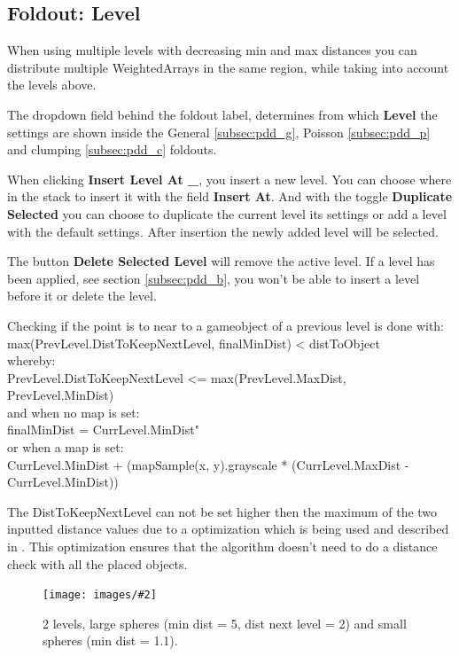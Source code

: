 \documentclass{paper}
\newlength{\imgwidth} %
\newcommand\scalegraphics[3][]
{
	\begin{figure}[H]
	\centering
	\settowidth{\imgwidth}{\texttt{[image: images/\#2]}} %
	\setlength{\imgwidth}{\minof{#1\imgwidth}{\textwidth}} %
	\texttt{[image: images/\#2]} %
	\caption{#3}
	\end{figure}
}
\newcommand*\bracket[1]{\lbrack#1\rbrack} %
\begin{document}
\subsection{Foldout: Level}
When using multiple levels with decreasing min and max distances you can distribute multiple WeightedArrays in the same region, while taking into account the levels above.
\par
The dropdown field behind the foldout label, determines from which \textbf{Level} the settings are shown inside the General \bracket{\ref{subsec:pdd_g}}, Poisson \bracket{\ref{subsec:pdd_p}} and clumping \bracket{\ref{subsec:pdd_c}} foldouts. 
\par
When clicking \textbf{\bracket{Insert Level At \_}}, you insert a new level. You can choose where in the stack to insert it with the field \textbf{Insert At}. And with the toggle \textbf{Duplicate Selected} you can choose to duplicate the current level its settings or add a level with the default settings. After insertion the newly added level will be selected.
\par
The button \textbf{\bracket{Delete Selected Level}} will remove the active level. If a level has been applied, see section \bracket{\ref{subsec:pdd_b}}, you won't be able to insert a level before it or delete the level.
\par
Checking if the point is to near to a gameobject of a previous level is done with:\\
\qquad max(PrevLevel.DistToKeepNextLevel, finalMinDist) < distToObject\\
whereby:\\
\qquad PrevLevel.DistToKeepNextLevel <= max(PrevLevel.MaxDist, PrevLevel.MinDist)\\
and when no map is set:\\
\qquad finalMinDist = CurrLevel.MinDist"\\
or when a map is set:\\
\qquad CurrLevel.MinDist + (mapSample(x, y).grayscale * (CurrLevel.MaxDist - CurrLevel.MinDist))
\par
The DistToKeepNextLevel can not be set higher then the maximum of the two inputted distance values due to a optimization which is being used and described in \cite{TUL09}. This optimization ensures that the algorithm doesn't need to do a distance check with all the placed objects.
\scalegraphics[0.6]{Foldout.png}{2 levels, large spheres (min dist = 5, dist next level = 2) and small spheres (min dist = 1.1).}

\newpage
\end{document}
